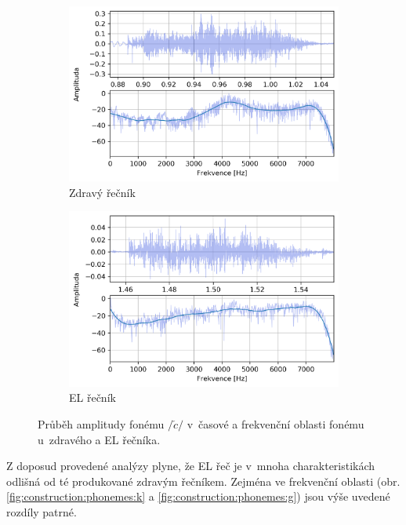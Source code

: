 \begin{figure}[htpb]
  \centering
  \begin{subfigure}[b]{0.45\textwidth}
    \includegraphics[width=\textwidth]{./parts/ch5-construction/img/signal-normal_c.png}
    \caption{Zdravý řečník}
    \label{fig:construction:phonemes:c:normal}
  \end{subfigure}
  \begin{subfigure}[b]{0.45\textwidth}
    \includegraphics[width=\textwidth]{./parts/ch5-construction/img/signal-el_c.png}
    \caption{EL řečník}
    \label{fig:construction:phonemes:c:el}
  \end{subfigure}
  \caption[Průběh amplitudy fonému $/\check{c}/$ zdravého a EL řečníka.]{Průběh amplitudy fonému $/\check{c}/$ v~časové a frekvenční oblasti fonému u~zdravého a EL řečníka.}
  \label{fig:construction:phonemes:c}
\end{figure}

Z doposud provedené analýzy plyne, že EL řeč je v~mnoha charakteristikách odlišná od té produkované zdravým řečníkem.
Zejména ve frekvenční oblasti (obr. \ref{fig:construction:phonemes:k} a \ref{fig:construction:phonemes:g}) jsou výše uvedené rozdíly patrné.

